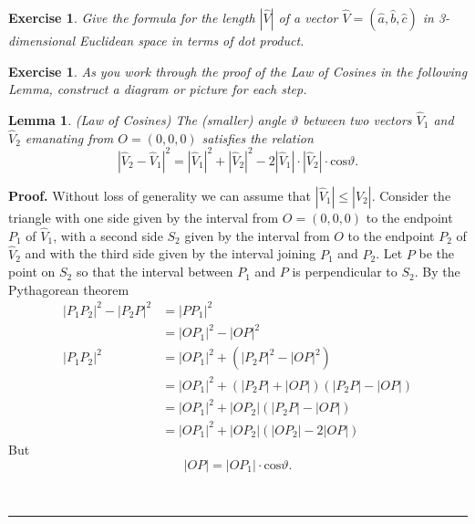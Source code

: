 \documentclass{article}%
\newtheorem{exercise}[theorem]{Exercise}
\newtheorem{lemma}[theorem]{Lemma}
\newenvironment{proof}[1][Proof]{\noindent\textbf{#1.} }{\ \rule{0.5em}{0.5em}}
\begin{document}
\begin{exercise}
Give the formula for the length $\left\vert \hat{V}\right\vert $ of a vector
$\hat{V}=\left(  \hat{a},\hat{b},\hat{c}\right)  $ in 3-dimensional Euclidean
space in terms of dot product.
\end{exercise}

\begin{exercise}
As you work through the proof of the Law of Cosines in the following Lemma,
construct a diagram or picture for each step.
\end{exercise}

\begin{lemma}
\label{110}(Law of Cosines) The (smaller) angle $\vartheta$ between two
vectors $\hat{V}_{1}$ and $\hat{V}_{2}$ emanating from $O=\left(
0,0,0\right)  $ satisfies the relation%
\[
\left\vert \hat{V}_{2}-\hat{V}_{1}\right\vert ^{2}=\left\vert \hat{V}%
_{1}\right\vert ^{2}+\left\vert \hat{V}_{2}\right\vert ^{2}-2\left\vert
\hat{V}_{1}\right\vert \cdot\left\vert \hat{V}_{2}\right\vert \cdot
\mathrm{cos}\vartheta.
\]

\end{lemma}

\begin{proof}
Without loss of generality we can assume that $\left\vert \hat{V}%
_{1}\right\vert \leq\left\vert \hat{V}_{2}\right\vert $. Consider the triangle
with one side given by the interval from $O=\left(  0,0,0\right)  $ to the
endpoint $P_{1}$ of $\hat{V}_{1}$, with a second side $S_{2}$ given by the
interval from $O$ to the endpoint $P_{2}$ of $\hat{V}_{2}$ and with the third
side given by the interval joining $P_{1}$ and $P_{2}$. Let $P$ be the point
on $S_{2}$ so that the interval between $P_{1}$ and $P$ is perpendicular to
$S_{2}$. By the Pythagorean theorem%
\begin{align*}
\left\vert P_{1}P_{2}\right\vert ^{2}-\left\vert P_{2}P\right\vert ^{2}  &
=\left\vert PP_{1}\right\vert ^{2}\\
&  =\left\vert OP_{1}\right\vert ^{2}-\left\vert OP\right\vert ^{2}\\
\left\vert P_{1}P_{2}\right\vert ^{2}  &  =\left\vert OP_{1}\right\vert
^{2}+\left(  \left\vert P_{2}P\right\vert ^{2}-\left\vert OP\right\vert
^{2}\right) \\
&  =\left\vert OP_{1}\right\vert ^{2}+\left(  \left\vert P_{2}P\right\vert
+\left\vert OP\right\vert \right)  \left(  \left\vert P_{2}P\right\vert
-\left\vert OP\right\vert \right) \\
&  =\left\vert OP_{1}\right\vert ^{2}+\left\vert OP_{2}\right\vert \left(
\left\vert P_{2}P\right\vert -\left\vert OP\right\vert \right) \\
&  =\left\vert OP_{1}\right\vert ^{2}+\left\vert OP_{2}\right\vert \left(
\left\vert OP_{2}\right\vert -2\left\vert OP\right\vert \right)
\end{align*}
But%
\[
\left\vert OP\right\vert =\left\vert OP_{1}\right\vert \cdot\mathrm{cos}%
\vartheta.
\]

\end{proof}
\end{document}
